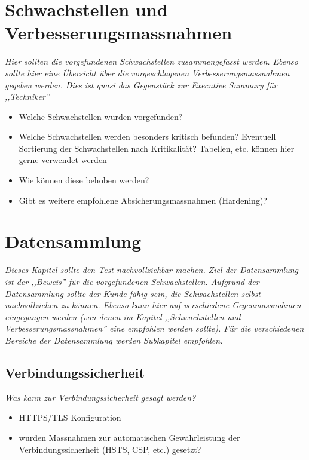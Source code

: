 \chapter{Schwachstellen und Verbesserungsmassnahmen}

\textit{Hier sollten die vorgefundenen Schwachstellen zusammengefasst werden. Ebenso sollte hier eine Übersicht über die vorgeschlagenen Verbesserungsmassnahmen gegeben werden. Dies ist quasi das Gegenstück zur Executive Summary für ,,Techniker''}

\begin{itemize}
				\item Welche Schwachstellen wurden vorgefunden?
				\item Welche Schwachstellen werden besonders kritisch befunden? Eventuell Sortierung der Schwachstellen nach Kritikalität? Tabellen, etc. können hier gerne verwendet werden
				\item Wie können diese behoben werden?
				\item Gibt es weitere empfohlene Absicherungsmassnahmen (Hardening)?
\end{itemize}

\chapter{Datensammlung}

\textit{Dieses Kapitel sollte den Test nachvollziehbar machen. Ziel der Datensammlung ist der ,,Beweis'' für die vorgefundenen Schwachstellen. Aufgrund der Datensammlung sollte der Kunde fähig sein, die Schwachstellen selbst nachvollziehen zu können. Ebenso kann hier auf verschiedene Gegenmassnahmen eingegangen werden (von denen im Kapitel ,,Schwachstellen und Verbesserungsmassnahmen'' eine empfohlen werden sollte). Für die verschiedenen Bereiche der Datensammlung werden Subkapitel empfohlen.}

\section{Verbindungssicherheit}

\textit{Was kann zur Verbindungssicherheit gesagt werden?}

\begin{itemize}
				\item HTTPS/TLS Konfiguration
				\item wurden Massnahmen zur automatischen Gewährleistung der Verbindungssicherheit (HSTS, CSP, etc.) gesetzt?
\end{itemize}

